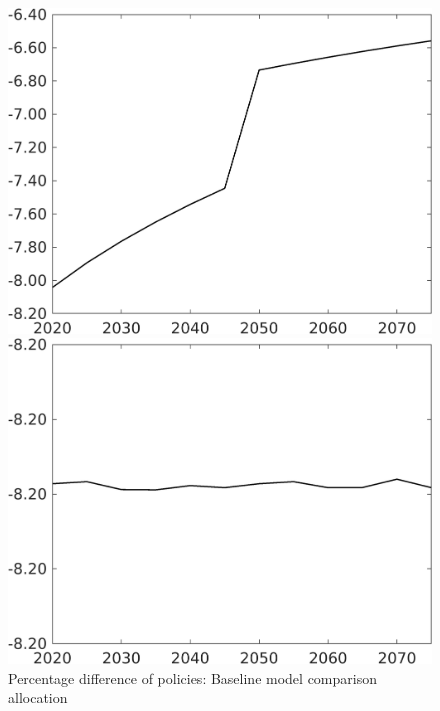\documentclass[12pt]{article}
\begin{document}
\begin{figure}[h!!]
	\centering
	\caption{Percentage difference of policies: Baseline model comparison allocation}\label{fig:Pertauf_nsk1_xgr0_notaul}
	\begin{minipage}[]{0.32\textwidth}
		\includegraphics[width=1\textwidth]{../../codding_model/own_basedOnFried/optimalPol_010922_revision/figures/all_13Sept22/CompTaufPER_bytaul_Reg0_tauf_spillover0_nsk1_xgr0_knspil0_sep1_LFlimit1_emsbase0_countec0_GovRev0_etaa0.79_lgd0.png}
	\end{minipage}		
	\begin{minipage}[]{0.32\textwidth}
		\includegraphics[width=1\textwidth]{../../codding_model/own_basedOnFried/optimalPol_010922_revision/figures/all_13Sept22/CompTaufPER_bytaul_Reg0_hh_spillover0_nsk1_xgr0_knspil0_sep1_LFlimit1_emsbase0_countec0_GovRev0_etaa0.79_lgd0.png}

\end{minipage}
\end{figure}
\end{document}
